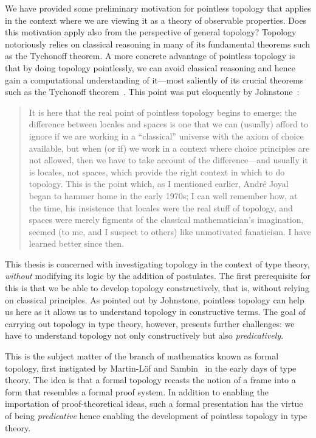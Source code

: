 We have provided some preliminary motivation for pointless topology that applies in the
context where we are viewing it as a theory of observable properties. Does this motivation
apply also from the perspective of general topology? Topology notoriously relies on
classical reasoning in many of its fundamental theorems such as the Tychonoff theorem. A
more concrete advantage of pointless topology is that by doing topology pointlessly, we
can avoid classical reasoning and hence gain a computational understanding of it---most
saliently of its crucial theorems such as the
Tychonoff theorem~\cite{coq-tychonoff, vickers-tychonoff}. This point was put eloquently
by Johnstone~\cite[pg.~46]{stone-spaces}:
\begin{quote}
  It is here that the real point of pointless topology begins to emerge; the difference
  between locales and spaces is one that we can (usually) afford to ignore if we are
  working in a ``classical'' universe with the axiom of choice available, but when (or if)
  we work in a context where choice principles are not allowed, then we have to take
  account of the difference—and usually it is locales, not spaces, which provide the right
  context in which to do topology. This is the point which, as I mentioned earlier,
  Andr\'{e} Joyal began to hammer home in the early 1970s; I can well remember how, at the
  time, his insistence that locales were the real stuff of topology, and spaces were
  merely figments of the classical mathematician's imagination, seemed (to me, and I
  suspect to others) like unmotivated fanaticism. I have learned better since then.
\end{quote}

This thesis is concerned with investigating topology in the context of type theory,
\emph{without} modifying its logic by the addition of postulates. The first prerequisite
for this is that we be able to develop topology constructively, that is, without relying
on classical principles. As pointed out by Johnstone, pointless topology can help us here
as it allows us to understand topology in constructive terms. The goal of carrying out
topology in type theory, however, presents further challenges: we have to understand
topology not only constructively but also \emph{predicatively}.

This is the subject matter of the branch of mathematics known as formal topology, first
instigated by Martin-Löf and Sambin~\cite{int-formal-spaces} in the early days of type
theory. The idea is that a formal topology recasts the notion of a frame into a form that
resembles a formal proof system. In addition to enabling the importation of
proof-theoretical ideas, such a formal presentation has the virtue of being
\emph{predicative} hence enabling the development of pointless topology in type theory.

